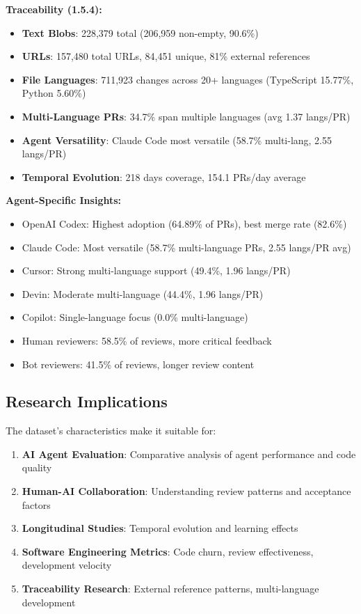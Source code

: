 \documentclass[11pt]{article}
\begin{document}
\textbf{Traceability (1.5.4):}
\begin{itemize}
    \item \textbf{Text Blobs}: 228,379 total (206,959 non-empty, 90.6\%)
    \item \textbf{URLs}: 157,480 total URLs, 84,451 unique, 81\% external references
    \item \textbf{File Languages}: 711,923 changes across 20+ languages (TypeScript 15.77\%, Python 5.60\%)
    \item \textbf{Multi-Language PRs}: 34.7\% span multiple languages (avg 1.37 langs/PR)
    \item \textbf{Agent Versatility}: Claude Code most versatile (58.7\% multi-lang, 2.55 langs/PR)
    \item \textbf{Temporal Evolution}: 218 days coverage, 154.1 PRs/day average
\end{itemize}

\textbf{Agent-Specific Insights:}
\begin{itemize}
    \item OpenAI Codex: Highest adoption (64.89\% of PRs), best merge rate (82.6\%)
    \item Claude Code: Most versatile (58.7\% multi-language PRs, 2.55 langs/PR avg)
    \item Cursor: Strong multi-language support (49.4\%, 1.96 langs/PR)
    \item Devin: Moderate multi-language (44.4\%, 1.96 langs/PR)
    \item Copilot: Single-language focus (0.0\% multi-language)
    \item Human reviewers: 58.5\% of reviews, more critical feedback
    \item Bot reviewers: 41.5\% of reviews, longer review content
\end{itemize}

\subsection{Research Implications}

The dataset's characteristics make it suitable for:
\begin{enumerate}
    \item \textbf{AI Agent Evaluation}: Comparative analysis of agent performance and code quality
    \item \textbf{Human-AI Collaboration}: Understanding review patterns and acceptance factors
    \item \textbf{Longitudinal Studies}: Temporal evolution and learning effects
    \item \textbf{Software Engineering Metrics}: Code churn, review effectiveness, development velocity
    \item \textbf{Traceability Research}: External reference patterns, multi-language development
\end{enumerate}
\end{document}
